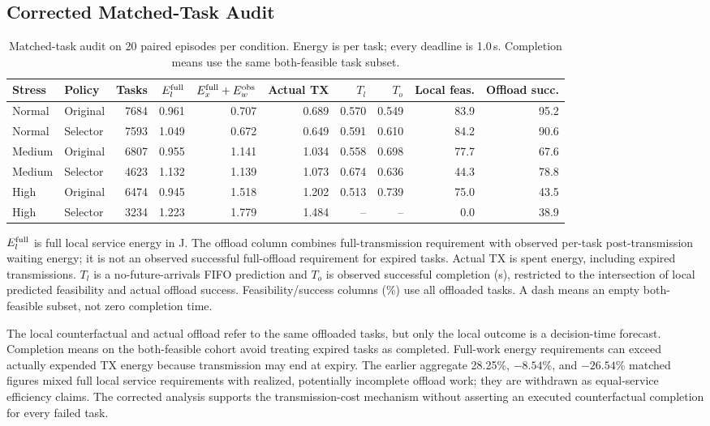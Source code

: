 \documentclass[conference]{IEEEtran}
\begin{document}
\subsection{Corrected Matched-Task Audit}
\begin{table}[t]
\centering\footnotesize
\caption{Matched-task audit on 20 paired episodes per condition. Energy is per task; every deadline is 1.0\,s. Completion means use the same both-feasible task subset.}
\label{tab:counter}
\begin{tabular}{@{}llrrrrrrrr@{}}\toprule
Stress & Policy & Tasks & $E_l^{\rm full}$ & $E_x^{\rm full}+E_w^{\rm obs}$ & Actual TX & $T_l$ & $T_o$ & Local feas. & Offload succ.\\\midrule
Normal & Original & 7684 & 0.961 & 0.707 & 0.689 & 0.570 & 0.549 & 83.9 & 95.2 \\
Normal & Selector & 7593 & 1.049 & 0.672 & 0.649 & 0.591 & 0.610 & 84.2 & 90.6 \\
Medium & Original & 6807 & 0.955 & 1.141 & 1.034 & 0.558 & 0.698 & 77.7 & 67.6 \\
Medium & Selector & 4623 & 1.132 & 1.139 & 1.073 & 0.674 & 0.636 & 44.3 & 78.8 \\
High & Original & 6474 & 0.945 & 1.518 & 1.202 & 0.513 & 0.739 & 75.0 & 43.5 \\
High & Selector & 3234 & 1.223 & 1.779 & 1.484 & -- & -- & 0.0 & 38.9 \\
\bottomrule\end{tabular}

\par\smallskip\begin{minipage}{\textwidth}\footnotesize $E_l^{\rm full}$ is full local service energy in J. The offload column combines full-transmission requirement with observed per-task post-transmission waiting energy; it is not an observed successful full-offload requirement for expired tasks. Actual TX is spent energy, including expired transmissions. $T_l$ is a no-future-arrivals FIFO prediction and $T_o$ is observed successful completion (s), restricted to the intersection of local predicted feasibility and actual offload success. Feasibility/success columns (\%) use all offloaded tasks. A dash means an empty both-feasible subset, not zero completion time.\end{minipage}
\end{table}

The local counterfactual and actual offload refer to the same offloaded tasks, but only the local outcome is a decision-time forecast. Completion means on the both-feasible cohort avoid treating expired tasks as completed. Full-work energy requirements can exceed actually expended TX energy because transmission may end at expiry. The earlier aggregate 28.25\%, $-8.54$\%, and $-26.54$\% matched figures mixed full local service requirements with realized, potentially incomplete offload work; they are withdrawn as equal-service efficiency claims. The corrected analysis supports the transmission-cost mechanism without asserting an executed counterfactual completion for every failed task.
\end{document}
